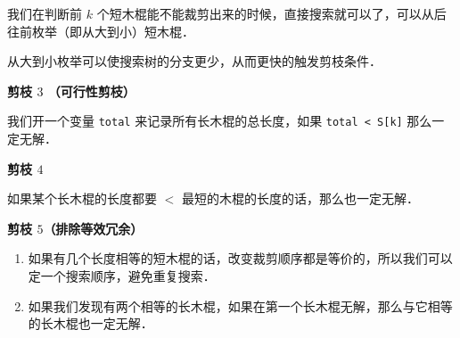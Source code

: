 我们在判断前 $k$ 个短木棍能不能裁剪出来的时候，直接搜索就可以了，可以从后往前枚举（即从大到小）短木棍．

从大到小枚举可以使搜索树的分支更少，从而更快的触发剪枝条件．

\textbf{剪枝 $3$ （可行性剪枝）}

我们开一个变量 \verb|total| 来记录所有长木棍的总长度，如果 \verb|total < S[k]| 那么一定无解．

\textbf{剪枝 $4$ }

如果某个长木棍的长度都要 $<$ 最短的木棍的长度的话，那么也一定无解．

\textbf{剪枝 $5$（排除等效冗余）}
\begin{enumerate}
\item 如果有几个长度相等的短木棍的话，改变裁剪顺序都是等价的，所以我们可以定一个搜索顺序，避免重复搜索．

\item 如果我们发现有两个相等的长木棍，如果在第一个长木棍无解，那么与它相等的长木棍也一定无解．

\end{enumerate}

